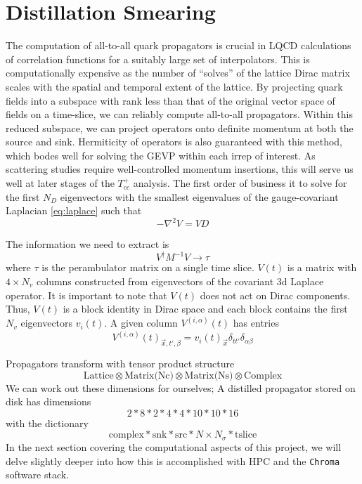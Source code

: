 \section{Distillation Smearing}
The computation of all-to-all quark propagators is crucial in LQCD calculations of correlation functions for a suitably large set of interpolators. This is computationally expensive as the number of ``solves'' of the lattice Dirac matrix scales with the spatial and temporal extent of the lattice. By projecting quark fields into a subspace with rank less than that of the original vector space of fields on a time-slice, we can reliably compute all-to-all propagators\cite{peardon_novel_2009}. Within this reduced subspace, we can project operators onto definite momentum at both the source and sink. Hermiticity of operators is also guaranteed with this method, which bodes well for solving the GEVP within each irrep of interest. As scattering studies require well-controlled momentum insertions, this will serve us well at later stages of the $T_{cc}^+$ analysis.  
The first order of business it to solve for the first $N_D$ eigenvectors with the smallest eigenvalues of the gauge-covariant Laplacian \ref{eq:laplace} such that 
\begin{equation}\label{eq:eigs}
    -\nabla^2V = VD
\end{equation} 

The information we need to extract is 
$$ V^{\dagger}M^{-1}V \rightarrow \tau $$ 
where $\tau$ is the perambulator matrix on a single time slice. 
$V(t)$ is a matrix with $4 \times N_v $  columns constructed from eigenvectors of the covariant 3d Laplace operator. It is important to note that $V(t)$ does not act on Dirac components. Thus, $V(t)$ is a block identity in Dirac space and each block contains the first $N_v$ eigenvectors $v_i(t)$. A given column $V^{(i,\alpha)}(t)$ has entries 
\[V^{(i,\alpha)}(t)_{\vec{x},t',\beta} = v_i(t)_{\vec{x}} \delta_{tt'}\delta_{\alpha\beta}\]


Propagators transform with tensor product structure 
$$\text{Lattice} \otimes \text{Matrix(Nc)} \otimes \text{Matrix(Ns)} \otimes \text{Complex}$$
We can work out these dimensions for ourselves; A distilled propagator stored on disk has dimensions 
\begin{equation}
 2 * 8 * 2 * 4 * 4 * 10 * 10 * 16 
\end{equation}
with the dictionary 
\begin{equation}
 \text{} \text{complex} * \text{snk} * \text{src} * N \times N_{\sigma} * \text{tslice}
\end{equation}
In the next section covering the computational aspects of this project, we will delve slightly deeper into how this is accomplished with HPC and the \texttt{Chroma} software stack.

